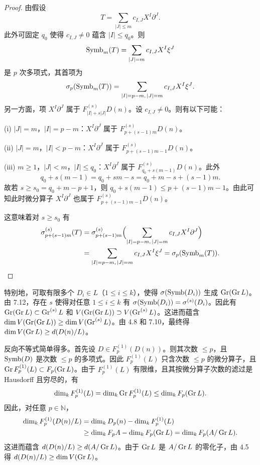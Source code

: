 \begin{proof}
由假设
$$T=\sum_{|J|\le m}c_{I,J}X^I\partial^J.$$
此外可固定 $q_0$ 使得 $c_{I,J}\neq 0$ 蕴含 $|I|\le q_0$。则
$$\operatorname{Symb}_m(T)=\sum_{|J|=m}c_{I,J}X^I\xi^J$$
是 $p$ 次多项式，其首项为
$$\sigma_p(\operatorname{Symb}_m(T))=\sum_{|I|=p-m,\,|J|=m}c_{I,J}X^I\xi^J.$$
另一方面，项 $X^I\partial^J$ 属于 $F^{(s)}_{|I|+s|J|}D(n)$。设 $c_{I,J}\neq 0$。则有以下可能：

(i) $|J|=m$，$|I|=p-m$：$X^I\partial^J$ 属于 $F^{(s)}_{p+(s-1)m}D(n)$。

(ii) $|J|=m$，$|I|<p-m$：$X^I\partial^J$ 属于 $F^{(s)}_{p+(s-1)m-1}D(n)$。

(iii) $m\ge 1$，$|J|<m$，$|I|\le q_0$：$X^I\partial^J$ 属于 $F^{(s)}_{q_0+s(m-1)}D(n)$。此外
$$q_0+s(m-1)=q_0+sm-s=q_0+m-s+(s-1)m.$$
故若 $s\ge s_0=q_0+m-p+1$，则 $q_0+s(m-1)\le p+(s-1)m-1$。由此可知此时微分算子 $X^I\partial^J$ 也属于 $F^{(s)}_{p+(s-1)m-1}D(n)$。

这意味着对 $s\ge s_0$ 有
\begin{align*}
\sigma^{(s)}_{p+(s-1)m}(T)&=\sigma^{(s)}_{p+(s-1)m}\Bigl(\sum_{|I|=p-m,\,|J|=m}c_{I,J}X^I\partial^J\Bigr)\\
&=\sum_{|I|=p-m,\,|J|=m}c_{I,J}X^I\xi^J=\sigma_p(\operatorname{Symb}_m(T)).
\end{align*}
\end{proof}

特别地，可取有限多个 $D_i\in L$（$1\le i\le k$），使得 $\sigma(\operatorname{Symb}(D_i))$ 生成 $\operatorname{Gr}(\operatorname{Gr} L)$。由 7.12，存在 $s$ 使得对任意 $1\le i\le k$ 有 $\sigma(\operatorname{Symb}(D_i))=\sigma^{(s)}(D_i)$。因此有 $\operatorname{Gr}(\operatorname{Gr} L)\subset\operatorname{Gr}^{(s)}L$ 和 $V(\operatorname{Gr}(\operatorname{Gr} L))\supset V(\operatorname{Gr}^{(s)}L)$。这进而蕴含 $\dim V(\operatorname{Gr}(\operatorname{Gr} L))\ge\dim V(\operatorname{Gr}^{(s)}L)$。由 4.8 和 7.10，最终得 $\dim V(\operatorname{Gr} L)\ge d(D(n)/L)$。

反向不等式简单得多。首先设 $D\in F^{(1)}_p(D(n))$。则其次数 $\le p$，且 $\operatorname{Symb}(D)$ 是次数 $\le p$ 的多项式。因此 $F^{(1)}_p(L)$ 只含次数 $\le p$ 的微分算子，且 $\operatorname{Gr} F^{(1)}_p(L)\subset F_p(\operatorname{Gr} L)$。由于 $F^{(1)}_p(L)$ 有限维，且其按微分算子次数的滤过是 Hausdorff 且穷尽的，有
$$\dim_k F^{(1)}_p(L)=\dim_k\operatorname{Gr} F^{(1)}_p(L)\le\dim_k F_p(\operatorname{Gr} L).$$
因此，对任意 $p\in\mathbb{N}$，
\begin{align*}
\dim_k F^{(1)}_p(D(n)/L)&=\dim_k D_p(n)-\dim_k F^{(1)}_p(L)\\
&\ge\dim_k F_p A-\dim_k F_p(\operatorname{Gr} L)=\dim_k F_p(A/\operatorname{Gr} L).
\end{align*}
这进而蕴含 $d(D(n)/L)\ge d(A/\operatorname{Gr} L)$。由于 $\operatorname{Gr} L$ 是 $A/\operatorname{Gr} L$ 的零化子，由 4.5 得 $d(D(n)/L)\ge\dim V(\operatorname{Gr} L)$。

